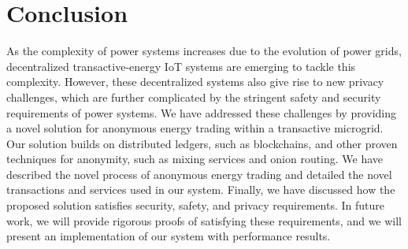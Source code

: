 \section{Conclusion}
\label{sec:concl}

As the complexity of power systems increases due to the evolution of power grids, decentralized transactive-energy IoT systems are emerging to tackle this complexity.
However, these decentralized systems also give rise to new privacy challenges, which are further complicated by the stringent safety and security requirements of power systems.
We have addressed these challenges by providing a novel solution for anonymous energy trading within a transactive microgrid.
Our solution builds on distributed ledgers, such as blockchains, and other proven techniques for anonymity, such as mixing services and onion routing.
We have described the novel process of anonymous energy trading and detailed the novel transactions and services used in our system.
Finally, we have discussed how the proposed solution satisfies security, safety, and privacy requirements.
In future work, we will provide rigorous proofs of satisfying these requirements, and we will present an implementation of our system with performance results.
